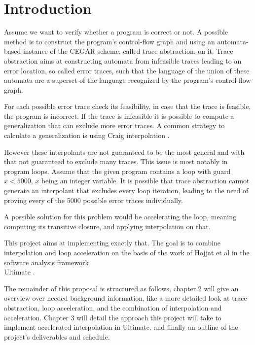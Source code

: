 \documentclass{article}
\begin{document}
\section{Introduction}
Assume we want to verify whether a program is correct or not. A possible method is to construct the program's control-flow graph and using an automata-based instance of the CEGAR scheme, called trace abstraction, on it. Trace abstraction aims at constructing automata \cite{10.1007/978-3-642-39799-8_2} from infeasible traces leading to an error location, so called error traces, such that the language of the union of these automata are a superset of the language recognized by the program's control-flow graph. \par 
For each possible error trace check its feasibility, in case that the trace is feasible, the program is incorrect. If the trace is infeasible it is possible to compute a generalization that can exclude more error traces. A common strategy \cite{10.1007/978-3-642-03237-0_7} to calculate a generalization is using Craig interpolation \cite{craig_1957}. \par 
However these interpolants are not guaranteed to be the most general and with that not guaranteed to exclude many traces. This issue is most notably in program loops. Assume that the given program contains a loop with guard $x < 5000$, $x$ being an integer variable. It is possible that trace abstraction cannot generate an interpolant that excludes every loop iteration, leading to the need of proving every of the 5000 possible error traces individually. \par
A possible solution for this problem would be accelerating the loop, meaning computing its transitive closure, and applying interpolation on that. \par This project aims at implementing exactly that. 
The goal is to combine interpolation and loop acceleration on the basis of the work of Hojjat et al \cite{10.1007/978-3-642-33386-6_16} in the software analysis framework \\ Ultimate \cite{Zitat02}. \par
The remainder of this proposal is structured as follows, chapter 2 will give an overview over needed background information, like a more detailed look at trace abstraction, loop acceleration, and the combination of interpolation and acceleration. Chapter 3 will detail the approach this project will take to implement accelerated interpolation in Ultimate, and finally an outline of the project's deliverables and schedule.
\end{document}
